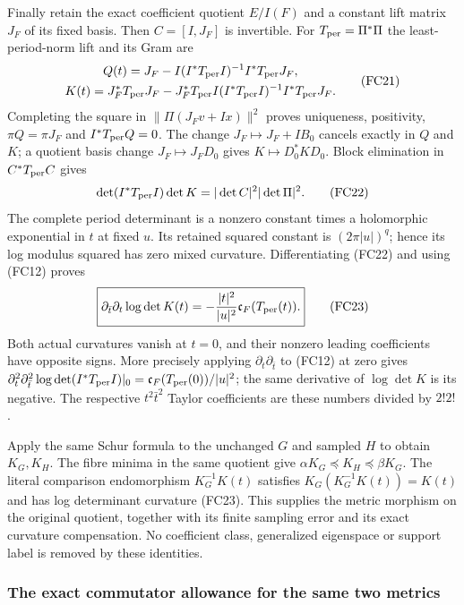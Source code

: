 Finally retain the exact coefficient quotient $E/I(F)$ and a constant
lift matrix $J_F$ of its fixed basis. Then $C=[I,J_F]$ is invertible.
For $T_{\rm per}=\Pi^*\Pi$ the least-period-norm lift and its Gram are
\[
\begin{gathered}
 Q(t)=J_F-I(I^*T_{\rm per}I)^{-1}I^*T_{\rm per}J_F,\\
 K(t)=J_F^*T_{\rm per}J_F
   -J_F^*T_{\rm per}I(I^*T_{\rm per}I)^{-1}I^*T_{\rm per}J_F.
\end{gathered}\tag{FC21}
\]
Completing the square in $\|\Pi(J_Fv+Ix)\|^2$ proves uniqueness,
positivity, $\pi Q=\pi J_F$ and $I^*T_{\rm per}Q=0$.
The change $J_F\mapsto J_F+IB_0$ cancels exactly in $Q$ and $K$;
a quotient basis change $J_F\mapsto J_FD_0$ gives $K\mapsto D_0^*KD_0$.
Block elimination in $C^*T_{\rm per}C$ gives
\[
 \det(I^*T_{\rm per}I)\det K
       =|\det C|^2|\det\Pi|^2.
 \tag{FC22}
\]
The complete period determinant is a nonzero constant times a
holomorphic exponential in $t$ at fixed $u$. Its retained squared
constant is $(2\pi|u|)^q$; hence its log modulus squared has zero mixed
curvature. Differentiating (FC22) and using (FC12) proves
\[
 \boxed{\partial_{\bar t}\partial_t\log\det K(t)
       =-\frac{|t|^2}{|u|^2}\mathfrak c_F(T_{\rm per}(t)).}
 \tag{FC23}
\]
Both actual curvatures vanish at $t=0$, and their nonzero leading
coefficients have opposite signs. More precisely applying
$\partial_t\partial_{\bar t}$ to (FC12) at zero gives
$\partial_t^2\partial_{\bar t}^2\log\det(I^*T_{\rm per}I)|_0
=\mathfrak c_F(T_{\rm per}(0))/|u|^2$; the same derivative of
$\log\det K$ is its negative. The respective $t^2\bar t^2$ Taylor
coefficients are these numbers divided by $2!2!$.

Apply the same Schur formula to the unchanged $G$ and sampled $H$ to
obtain $K_G,K_H$. The fibre minima in the same quotient give
$\alpha K_G\preceq K_H\preceq\beta K_G$.
The literal comparison endomorphism $K_G^{-1}K(t)$ satisfies
$K_G(K_G^{-1}K(t))=K(t)$ and has log determinant curvature (FC23).
This supplies the metric morphism on the original quotient, together
with its finite sampling error and its exact curvature compensation.
No coefficient class, generalized eigenspace or support label is
removed by these identities.

\subsubsection{The exact commutator allowance for the same two metrics}


